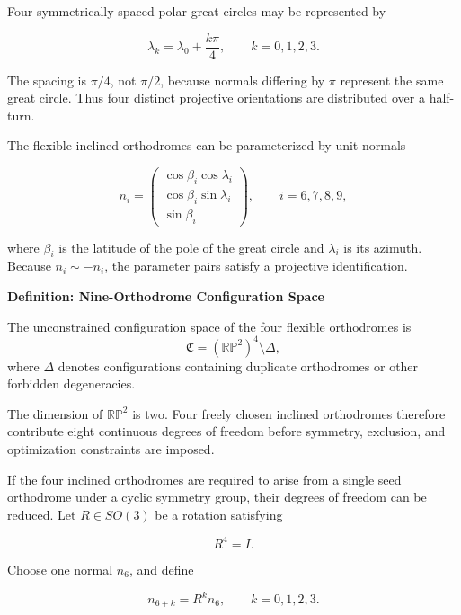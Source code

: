\documentclass[11pt,fleqn]{book}
\numberwithin{equation}{chapter}
\newenvironment{definition}[1]
  {\begin{definitionEnv}
   \noindent\textbf{Definition: #1}\par\smallskip}
  {\end{definitionEnv}}
\theoremstyle{plain}
\theoremstyle{definition}
\theoremstyle{remark}
\begin{document}
Four symmetrically spaced polar great circles may be represented by

\begin{equation}
    \lambda_k
    =
    \lambda_0+\frac{k\pi}{4},
    \qquad
    k=0,1,2,3.
\end{equation}

The spacing is \(\pi/4\), not \(\pi/2\), because normals differing by \(\pi\) represent the same great circle. Thus four distinct projective orientations are distributed over a half-turn.

The flexible inclined orthodromes can be parameterized by unit normals

\begin{equation}
    \label{eq:flexible-normal}
    n_i
    =
    \begin{pmatrix}
      \cos\beta_i\cos\lambda_i\\
      \cos\beta_i\sin\lambda_i\\
      \sin\beta_i
    \end{pmatrix},
    \qquad
    i=6,7,8,9,
\end{equation}

where \(\beta_i\) is the latitude of the pole of the great circle and \(\lambda_i\) is its azimuth. Because \(n_i\sim -n_i\), the parameter pairs satisfy a projective identification.

\begin{definition}{Nine-Orthodrome Configuration Space}
The unconstrained configuration space of the four flexible orthodromes is
\[
\mathfrak{C}
=
\left(\mathbb{RP}^{2}\right)^4
\setminus \Delta,
\]
where \(\Delta\) denotes configurations containing duplicate orthodromes or other forbidden degeneracies.
\end{definition}

The dimension of \(\mathbb{RP}^{2}\) is two. Four freely chosen inclined orthodromes therefore contribute eight continuous degrees of freedom before symmetry, exclusion, and optimization constraints are imposed.

If the four inclined orthodromes are required to arise from a single seed orthodrome under a cyclic symmetry group, their degrees of freedom can be reduced. Let \(R\in SO(3)\) be a rotation satisfying

\begin{equation}
    R^4=I.
\end{equation}

Choose one normal \(n_6\), and define

\begin{equation}
    n_{6+k}=R^k n_6,
    \qquad
    k=0,1,2,3.
\end{equation}
\end{document}
